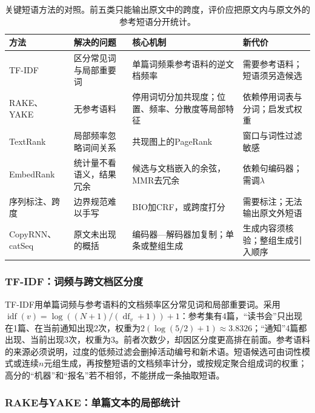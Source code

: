 \begin{table}[htbp]
 \centering
 \begin{tabularx}{\linewidth}{@{}>{\raggedright\arraybackslash}p{24mm}
   >{\raggedright\arraybackslash}p{32mm}>{\raggedright\arraybackslash}X
   >{\raggedright\arraybackslash}p{40mm}@{}}
  \toprule
  方法 & 解决的问题 & 核心机制 & 新代价 \\
  \midrule
  TF-IDF & 区分常见词与局部重要词 & 单篇词频乘参考语料的逆文档频率 & 需要参考语料；短语须另造候选 \\
  RAKE、YAKE & 无参考语料 & 停用词切分加共现度；位置、频率、分散度等局部特征 & 依赖停用词表与分词；启发式权重 \\
  TextRank & 局部频率忽略词间关系 & 共现图上的PageRank & 窗口与词性过滤敏感 \\
  EmbedRank & 统计量不看语义，结果冗余 & 候选与文档嵌入的余弦，MMR去冗余 & 依赖句编码器；需调$\lambda$ \\
  序列标注、跨度 & 边界规范难以手写 & BIO加CRF，或跨度打分 & 需要标注；无法输出原文外短语 \\
  CopyRNN、catSeq & 原文未出现的概括 & 编码器—解码器加复制；单条或整组生成 & 生成内容须核验；整组生成引入顺序 \\
  \bottomrule
 \end{tabularx}
 \caption{关键短语方法的对照。前五类只能输出原文中的跨度，评价应把原文内与原文外的参考短语分开统计。}
 \label{tab:nlp-classification-keyphrase-methods}
\end{table}

\FloatBarrier
\subsubsection{TF-IDF：词频与跨文档区分度}
\label{sec:nlp-classification-keyword-tfidf}

TF-IDF用单篇词频与参考语料的文档频率区分常见词和局部重要词。采用$\operatorname{idf}(v)=\log((N+1)/(\operatorname{df}_v+1))+1$：参考集有4篇，“读书会”只出现在1篇、在当前通知出现2次，权重为$2(\log(5/2)+1)\approx3.8326$；“通知”4篇都出现、当前出现3次，权重为3。前者次数少，却因区分度更高排在前面。参考语料的来源必须说明，过度的低频过滤会删掉活动编号和新术语。短语候选可由词性模式或连续$n$元组生成，再按整短语的文档频率计分，或按规定聚合组成词的权重；高分的“机器”和“报名”若不相邻，不能拼成一条抽取短语。

\subsubsection{RAKE与YAKE：单篇文本的局部统计}
\label{sec:nlp-classification-rake}

